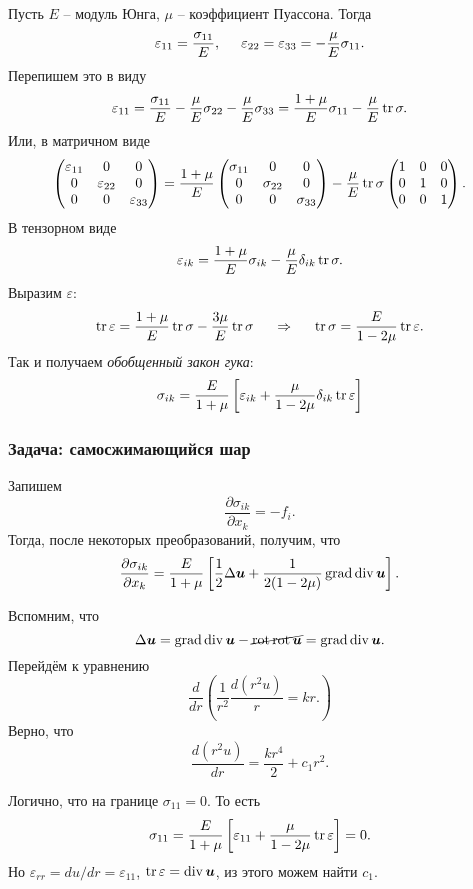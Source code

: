 Пусть $E$ -- модуль Юнга, $\mu$ -- коэффициент Пуассона. Тогда
$$
    \varepsilon_{11} = \frac{\sigma_{11}}{E}, \hspace{0.5cm} 
    \varepsilon_{22} = \varepsilon_{33} = - \frac{\mu}{E} \sigma_{11}.
$$
Перепишем это в виду
$$
    \varepsilon_{11} = \frac{\sigma_{11}}{E}  - \frac{\mu}{E} \sigma_{22} -
    \frac{\mu}{E} \sigma_{33} = \frac{1+\mu}{E} \sigma_{11} - \frac{\mu}{E} \mathop{\mathrm{tr}}\nolimits \sigma.
$$
Или, в матричном виде
$$
    \begin{pmatrix}
        \varepsilon_{11} & 0 & 0\\
        0 & \varepsilon_{22} & 0 \\
        0 & 0 & \varepsilon_{33}
    \end{pmatrix} =
    \frac{1+\mu}{E} 
    \begin{pmatrix}
        \sigma_{11} & 0 & 0\\
        0 & \sigma_{22} & 0 \\
        0 & 0 & \sigma_{33}
    \end{pmatrix} -
    \frac{\mu}{E} \mathop{\mathrm{tr}}\nolimits \sigma 
    \begin{pmatrix}
        1 & 0 & 0\\
        0 & 1 & 0 \\
        0 & 0 & 1
    \end{pmatrix}.
$$
В тензорном виде
$$
    \varepsilon_{ik} = \frac{1+\mu}{E} \sigma_{ik} - \frac{\mu}{E} \delta_{ik} \mathop{\mathrm{tr}}\nolimits \sigma .
$$
Выразим $\varepsilon$:
$$
    \mathop{\mathrm{tr}}\nolimits \varepsilon = \frac{1+\mu}{E} \mathop{\mathrm{tr}}\nolimits \sigma - \frac{3\mu}{E} \mathop{\mathrm{tr}}\nolimits \sigma
    \hspace{0.5cm} \Rightarrow \hspace{0.5cm} 
    \mathop{\mathrm{tr}}\nolimits \sigma = \frac{E}{1-2\mu} \mathop{\mathrm{tr}}\nolimits \varepsilon.
$$
Так и получаем \textit{обобщенный закон гука}:
\begin{equation}
    \sigma_{ik} = \frac{E}{1+\mu} \left[
        \varepsilon_{ik} + \frac{\mu}{1 - 2\mu} \delta_{ik} \mathop{\mathrm{tr}}\nolimits \varepsilon 
    \right]
\end{equation}

\subsubsection*{Задача: самосжимающийся шар}
Запишем
$$
    \frac{\partial \sigma_{ik}}{\partial x_k} = - f_i.
$$
Тогда, после некоторых преобразований, получим, что
$$
    \frac{\partial \sigma_{ik}}{\partial x_k} =
    \frac{E}{1+\mu}  \left[
        \frac{1}{2} \Delta \mbox{\boldmath $u$} + \frac{1}{2(1-2\mu)} \mathop{\mathrm{grad}}\nolimits \mathop{\mathrm{div}}\nolimits \mbox{\boldmath $u$}
    \right].
$$

Вспомним, что
$$
    \Delta \mbox{\boldmath $u$} = \mathop{\mathrm{grad}}\nolimits \mathop{\mathrm{div}}\nolimits \mbox{\boldmath $u$} - \cancel{\mathop{\mathrm{rot}}\nolimits \mathop{\mathrm{rot}}\nolimits \mbox{\boldmath $u$}} = \mathop{\mathrm{grad}}\nolimits \mathop{\mathrm{div}}\nolimits \mbox{\boldmath $u$}.
$$
Перейдём к уравнению
\begin{equation}
    \frac{d}{dr} \left(
        \frac{1}{r^2} \frac{d (r^2 u)}{r} = kr.
    \right)
\end{equation}
Верно, что
$$
    \frac{d (r^2 u)}{dr} = \frac{kr^4}{2} + c_1 r^2.
$$

Логично, что на границе $\sigma_{11} = 0$. То есть
$$
    \sigma_{11} = \frac{E}{1+\mu} \left[\varepsilon_{11} + \frac{\mu}{1-2\mu} \mathop{\mathrm{tr}}\nolimits \varepsilon \right] = 0.
$$
Но $\varepsilon_{rr} = du / dr = \varepsilon_{11}$, $\mathop{\mathrm{tr}}\nolimits \varepsilon = \mathop{\mathrm{div}}\nolimits \mbox{\boldmath $u$}$, из этого можем найти $c_1$.